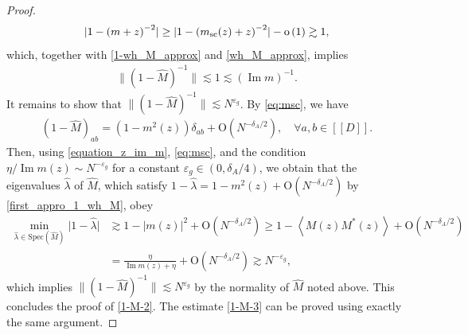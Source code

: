 \documentclass[10pt,reqno]{amsart}
\numberwithin{equation}{section}
\numberwithin{figure}{section}
\theoremstyle{plain} %
\theoremstyle{definition} %
\newcommand{\wh}{\widehat}
\renewcommand{\txt}[1]{\text{\rm{#1}}}
\renewcommand{\geq}{\ge}
\newcommand{\qq}[1]{[\![{#1}]\!]}
\newcommand{\p}[1]{({#1})}
\newcommand{\pa}[1]{\left({#1}\right)}
\newcommand{\abs}[1]{\lvert #1 \rvert}
\newcommand{\absa}[1]{\left\lvert #1 \right\rvert}
\newcommand{\norm}[1]{\lVert #1 \rVert}
\newcommand{\avga}[1]{\left\langle #1 \right\rangle}
\DeclareMathOperator{\im}{\mathrm{Im}}
\newcommand{\oo}{\mathrm{o}}
\newcommand{\OO}{\mathrm{O}}
\numberwithin{equation}{section}
\begin{document}
\begin{proof}
\begin{equation}
\begin{aligned}
            \abs{1-\pa{m+z}^{-2}}\geq \abs{1-\pa{m_{\txt{sc}} (z) +z}^{-2}}-\oo\pa{1}\gtrsim 1,
        \end{aligned}
    \end{equation}
    which, together with \eqref{1-wh_M_approx} and \eqref{wh_M_approx}, implies 
    \begin{equation}\nonumber
        \begin{aligned}
            \norm{\p{1-\wh M}^{-1}}\lesssim 1\lesssim \pa{\im m}^{-1}.
        \end{aligned}
    \end{equation}
    It remains to show that $\norm{\p{1-\wh M}^{-1}}\lesssim N^{\varepsilon_g}$. By \eqref{eq:msc}, we have  
     \begin{equation}\label{first_appro_1_wh_M}
         \begin{aligned}
             \p{1-\wh M}_{ab}=\pa{1-m^2 (z) }\delta_{ab}+\OO\p{N^{-\delta_A/2}},\quad \forall a,b\in \qq{D}.
         \end{aligned}
     \end{equation}
     Then, using \eqref{equation_z_im_m}, \eqref{eq:msc}, and the condition $\eta/\im m (z) \sim N^{-\varepsilon_g}$ for a constant $\varepsilon_g\in (0, \delta_A/4)$, we obtain that the eigenvalues $\wh\lambda$ of $\wh M$, which satisfy $1-\wh\lambda=1-m^2(z)+\OO\p{N^{-\delta_A/2}}$ by \eqref{first_appro_1_wh_M}, obey
     \begin{equation}\nonumber
         \begin{aligned}
       \min_{\wh\lambda\in\mathrm{Spec}(\wh M)}\big|1-\wh \lambda\big|&\gtrsim 
      1-\absa{m (z)}^2+\OO\p{N^{-\delta_A/2}}\geq 1-\avga{M (z) M^* (z) }+\OO\p{N^{-\delta_A/2}}\\
        & =\frac{\eta}{\im m (z) +\eta}+\OO\p{N^{-\delta_A/2}}\gtrsim N^{-\varepsilon_g},
         \end{aligned}
     \end{equation}
     which implies $\norm{\p{1-\wh M}^{-1}}\lesssim N^{\varepsilon_g}$ by the normality of $\wh M$ noted above. 
     This concludes the proof of \eqref{1-M-2}. The estimate \eqref{1-M-3} can be proved using exactly the same argument.
     
     



\end{proof}
\end{document}
